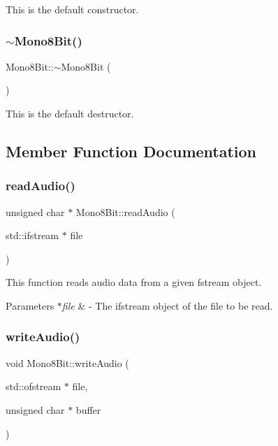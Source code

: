 This is the default constructor. \mbox{\label{classMono8Bit_a6d80c16fde48f386ba940510fecf4df4}} 
\subsubsection{\texorpdfstring{$\sim$\+Mono8\+Bit()}{~Mono8Bit()}}
{\footnotesize\ttfamily Mono8\+Bit\+::$\sim$\+Mono8\+Bit (\begin{DoxyParamCaption}{ }\end{DoxyParamCaption})}

This is the default destructor. 

\subsection{Member Function Documentation}
\mbox{\label{classMono8Bit_a9239252fec82e2a816f90be56e13d9d1}} 
\subsubsection{\texorpdfstring{read\+Audio()}{readAudio()}}
{\footnotesize\ttfamily unsigned char $\ast$ Mono8\+Bit\+::read\+Audio (\begin{DoxyParamCaption}\item[{std\+::ifstream $\ast$}]{file }\end{DoxyParamCaption})}

This function reads audio data from a given fstream object. 
\begin{DoxyParams}{Parameters}
{\em $\ast$file} & -\/ The ifstream object of the file to be read. \\
\hline
\end{DoxyParams}
\mbox{\label{classMono8Bit_ad84865e5e90cf6c00382fcd5a7df620c}} 
\subsubsection{\texorpdfstring{write\+Audio()}{writeAudio()}}
{\footnotesize\ttfamily void Mono8\+Bit\+::write\+Audio (\begin{DoxyParamCaption}\item[{std\+::ofstream $\ast$}]{file,  }\item[{unsigned char $\ast$}]{buffer }\end{DoxyParamCaption})}

